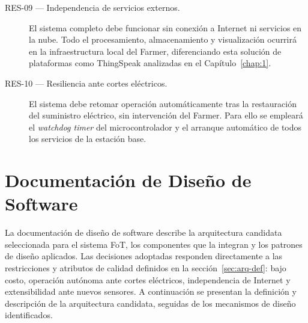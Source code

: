 \begin{description}
	\item[RES-09 — Independencia de servicios externos.]
	El sistema completo debe funcionar sin conexión a Internet ni servicios en la nube.
	Todo el procesamiento, almacenamiento y visualización ocurrirá en la infraestructura
	local del Farmer, diferenciando esta solución de plataformas como ThingSpeak
	analizadas en el Capítulo~\ref{chap:1}.
	
	\item[RES-10 — Resiliencia ante cortes eléctricos.]
	El sistema debe retomar operación automáticamente tras la restauración del suministro
	eléctrico, sin intervención del Farmer. Para ello se empleará el \textit{watchdog timer}
	del microcontrolador y el arranque automático de todos los servicios de la estación
	base.
	
\end{description}









% 
%







\section{Documentación de Diseño de Software}
\label{sec:disenio}

La documentación de diseño de software describe la arquitectura candidata
seleccionada para el sistema FoT, los componentes que la integran y los
patrones de diseño aplicados. Las decisiones adoptadas responden
directamente a las restricciones y atributos de calidad definidos en la
sección~\ref{sec:arq-def}: bajo costo, operación autónoma ante cortes
eléctricos, independencia de Internet y extensibilidad ante nuevos
sensores. A continuación se presentan la definición y descripción de la
arquitectura candidata, seguidas de los mecanismos de diseño identificados.


